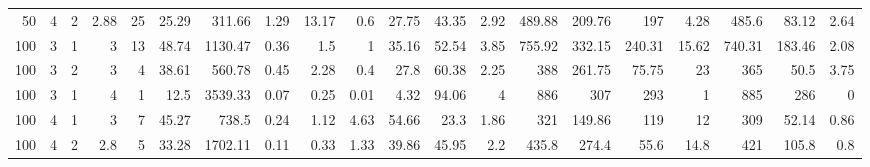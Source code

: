 \begin{tabular}{rrrrrrrrrrrrrrrrrrrr}
      50 &     4 &           2 &        2.88 &      25 &   25.29 &     311.66 &         1.29 &           13.17 &             0.6  &           27.75 &         43.35 &         2.92 &       489.88 &       209.76 &         197    &            4.28 &         485.6  &        83.12 &         2.64 \\
     100 &     3 &           1 &        3    &      13 &   48.74 &    1130.47 &         0.36 &            1.5  &             1    &           35.16 &         52.54 &         3.85 &       755.92 &       332.15 &         240.31 &           15.62 &         740.31 &       183.46 &         2.08 \\
     100 &     3 &           2 &        3    &       4 &   38.61 &     560.78 &         0.45 &            2.28 &             0.4  &           27.8  &         60.38 &         2.25 &       388    &       261.75 &          75.75 &           23    &         365    &        50.5  &         3.75 \\
     100 &     3 &           1 &        4    &       1 &   12.5  &    3539.33 &         0.07 &            0.25 &             0.01 &            4.32 &         94.06 &         4    &       886    &       307    &         293    &            1    &         885    &       286    &         0    \\
     100 &     4 &           1 &        3    &       7 &   45.27 &     738.5  &         0.24 &            1.12 &             4.63 &           54.66 &         23.3  &         1.86 &       321    &       149.86 &         119    &           12    &         309    &        52.14 &         0.86 \\
     100 &     4 &           2 &        2.8  &       5 &   33.28 &    1702.11 &         0.11 &            0.33 &             1.33 &           39.86 &         45.95 &         2.2  &       435.8  &       274.4  &          55.6  &           14.8  &         421    &       105.8  &         0.8  \\
\hline
\end{tabular}